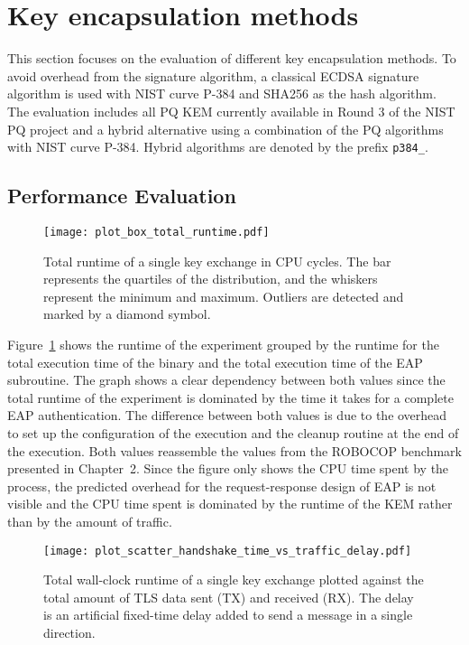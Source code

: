 \section{Key encapsulation methods}

This section focuses on the evaluation of different key encapsulation methods. To avoid overhead from the signature algorithm, a classical ECDSA signature algorithm is used with \ac{NIST} curve P-384 and SHA256 as the hash algorithm. The evaluation includes all \ac{PQ} \ac{KEM} currently available in Round 3 of the \ac{NIST} \ac{PQ} project and a hybrid alternative using a combination of the \ac{PQ} algorithms with \ac{NIST} curve P-384. Hybrid algorithms are denoted by the prefix \texttt{p384\_}. 

\subsection{Performance Evaluation}


\begin{figure}[t]
    \centering\texttt{[image: plot\_box\_total\_runtime.pdf]}
    \caption{Total runtime of a single key exchange in \acs{CPU} cycles. The bar represents the quartiles of the distribution, and the whiskers represent the minimum and maximum. Outliers are detected and marked by a diamond symbol.}\label{fig:plot_box_total_runtime}
\end{figure}


Figure~\ref{fig:plot_box_total_runtime} shows the runtime of the experiment grouped by the runtime for the total execution time of the binary and the total execution time of the \ac{EAP} subroutine. The graph shows a clear dependency between both values since the total runtime of the experiment is dominated by the time it takes for a complete \ac{EAP} authentication. The difference between both values is due to the overhead to set up the configuration of the execution and the cleanup routine at the end of the execution. Both values reassemble the values from the ROBOCOP benchmark presented in Chapter~2. Since the figure only shows the \acs{CPU} time spent by the process, the predicted overhead for the request-response design of \ac{EAP} is not visible and the \acs{CPU} time spent is dominated by the runtime of the \ac{KEM} rather than by the amount of traffic. 

\begin{figure}[t]
    \centering\texttt{[image: plot\_scatter\_handshake\_time\_vs\_traffic\_delay.pdf]}
    \caption{Total wall-clock runtime of a single key exchange plotted against the total amount of TLS data sent (TX) and received (RX). The delay is an artificial fixed-time delay added to send a message in a single direction.}\label{fig:plot_scatter_handshake_time_vs_traffic_delay.pdf}
\end{figure}

